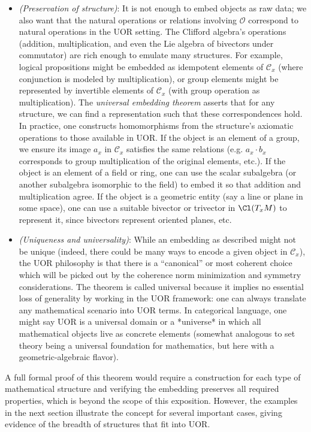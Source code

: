 \documentclass[12pt]{article}
\begin{document}
\begin{itemize}
\begin{itemize}
       \item \textit{(Preservation of structure)}: It is not enough to embed objects as raw data; we also want that the natural operations or relations involving $\mathcal{O}$ correspond to natural operations in the UOR setting. The Clifford algebra’s operations (addition, multiplication, and even the Lie algebra of bivectors under commutator) are rich enough to emulate many structures. For example, logical propositions might be embedded as idempotent elements of $\mathcal{C}_x$ (where conjunction is modeled by multiplication), or group elements might be represented by invertible elements of $\mathcal{C}_x$ (with group operation as multiplication). The \textit{universal embedding theorem} asserts that for any structure, we can find a representation such that these correspondences hold. In practice, one constructs homomorphisms from the structure’s axiomatic operations to those available in UOR. If the object is an element of a group, we ensure its image $a_x$ in $\mathcal{C}_x$ satisfies the same relations (e.g. $a_x \cdot b_x$ corresponds to group multiplication of the original elements, etc.). If the object is an element of a field or ring, one can use the scalar subalgebra (or another subalgebra isomorphic to the field) to embed it so that addition and multiplication agree. If the object is a geometric entity (say a line or plane in some space), one can use a suitable bivector or trivector in $\Cl(T_xM)$ to represent it, since bivectors represent oriented planes, etc.
       \item \textit{(Uniqueness and universality)}: While an embedding as described might not be unique (indeed, there could be many ways to encode a given object in $\mathcal{C}_x$), the UOR philosophy is that there is a “canonical” or most coherent choice which will be picked out by the coherence norm minimization and symmetry considerations. The theorem is called universal because it implies no essential loss of generality by working in the UOR framework: one can always translate any mathematical scenario into UOR terms. In categorical language, one might say UOR is a universal domain or a *universe* in which all mathematical objects live as concrete elements (somewhat analogous to set theory being a universal foundation for mathematics, but here with a geometric-algebraic flavor).
    \end{itemize}
    A full formal proof of this theorem would require a construction for each type of mathematical structure and verifying the embedding preserves all required properties, which is beyond the scope of this exposition. However, the examples in the next section illustrate the concept for several important cases, giving evidence of the breadth of structures that fit into UOR.
\end{itemize}
\end{document}

